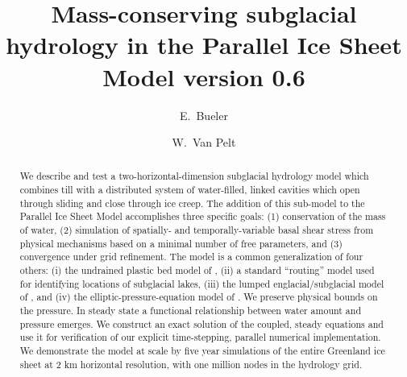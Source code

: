 \documentclass[gmd]{copernicus}   %
\begin{document}
\graphicspath{{figszip/}}


\title{Mass-conserving subglacial hydrology in the Parallel Ice Sheet Model version 0.6}


\author[1]{E.~Bueler}
\author[2]{W.~Van Pelt}





\received{}
\pubdiscuss{} %
\revised{}
\accepted{}
\published{}


\maketitle

\begin{abstract}
We describe and test a two-horizontal-dimension subglacial hydrology model which combines till with a distributed system of water-filled, linked cavities which open through sliding and close through ice creep.  The addition of this sub-model to the Parallel Ice Sheet Model accomplishes three specific goals: (1) conservation of the mass of water, (2) simulation of spatially- and temporally-variable basal shear stress from physical mechanisms based on a minimal number of free parameters, and (3) convergence under grid refinement.  The model is a common generalization of four others: (i) the undrained plastic bed model of \cite{Tulaczyketal2000b}, (ii) a standard ``routing'' model used for identifying locations of subglacial lakes, (iii) the lumped englacial/subglacial model of \cite{Bartholomausetal2011}, and (iv) the elliptic-pressure-equation model of \cite{Schoofetal2012}.  We preserve physical bounds on the pressure.  In steady state a functional relationship between water amount and pressure emerges.  We construct an exact solution of the coupled, steady equations and use it for verification of our explicit time-stepping, parallel numerical implementation.  We demonstrate the model at scale by five year simulations of the entire Greenland ice sheet at 2 km horizontal resolution, with one million nodes in the hydrology grid.
\end{abstract}
\end{document}

